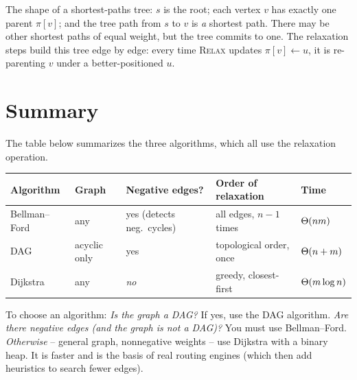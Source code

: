 \begin{algorithm}[H]
\caption{\textsc{Print-Path}($G, s, v$)}
\end{algorithm}

\begin{focusbox}
The shape of a shortest-paths tree: $s$ is the root; each vertex $v$ has exactly
one parent $\pi[v]$; and the tree path from $s$ to $v$ is \emph{a} shortest path.
There may be other shortest paths of equal weight, but the tree commits to one. The
relaxation steps build this tree edge by edge: every time \textsc{Relax} updates
$\pi[v]\leftarrow u$, it is re-parenting $v$ under a better-positioned $u$.
\end{focusbox}

\section{Summary}

The table below summarizes the three algorithms, which all use the
relaxation operation.

\begin{center}
\begin{tabular}{@{}lllll@{}}
\toprule
Algorithm & Graph & Negative edges? & Order of relaxation & Time \\
\midrule
Bellman--Ford & any & yes (detects neg.\ cycles) & all edges, $n-1$ times & $\Theta(nm)$ \\
DAG & acyclic only & yes & topological order, once & $\Theta(n+m)$ \\
Dijkstra & any & \emph{no} & greedy, closest-first & $\Theta(m\log n)$ \\
\bottomrule
\end{tabular}
\end{center}

\begin{intuitionbox}
To choose an algorithm: \emph{Is the graph a DAG?} If yes, use the
DAG algorithm. \emph{Are there negative edges (and the
graph is not a DAG)?} You must use Bellman--Ford. \emph{Otherwise} -- general graph, nonnegative weights -- use Dijkstra with a binary heap. It is faster and
is the basis of real routing engines (which then add heuristics to search fewer edges).
\end{intuitionbox}

